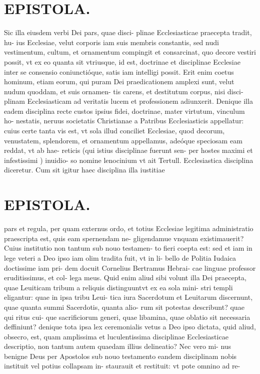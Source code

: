 \documentclass{article}
\begin{document}
\begin{pages}
\section*{EPISTOLA. }Sic illa eiusdem verbi Dei pars, quae disci- plinae Ecclesiasticae praecepta tradit, hu- ius Ecclesiae, velut corporis iam suis membris constantis, sed nudi vestimentum, cultum, et ornamentum compingit et consarcinat, quo decore vestiri possit, vt ex eo quanta sit vtriusque, id est, doctrinae et disciplinae Ecclesiae inter se consensio coniunctióque, satis iam intelligi possit. Erit enim coetus hominum, etiam eorum, qui puram Dei praedicationem amplexi sunt, velut nudum quoddam, et suis ornamen- tis carens, et destitutum corpus, nisi disci- plinam Ecclesiasticam ad veritatis lucem et professionem adiunxerit. Denique illa eadem disciplina recte custos ipsius fidei, doctrinae, mater virtutum, vinculum ho- nestatis, neruus societatis Christianae a Patribus Ecclesiasticis appellatur: cuius certe tanta vis est, vt sola illud conciliet Ecclesiae, quod decorum, venustatem, splendorem, et ornamentum appellamus, adeóque speciosam eam reddat, vt ab hae- reticis (qui istius disciplinae fuerunt sen- per hostes maximi et infestissimi ) inuidio- so nomine lenocinium vt ait Tertull. Ecclesiastica disciplina diceretur. Cum sit igitur haec disciplina illa iustitiae 
\section*{EPISTOLA. }pars et regula, per quam externus ordo, et totius Ecclesiae legitima administratio praescripta est, quis eam spernendam ne- gligendamue vnquam existimauerit? Cuius institutio non tantum sub nouo testamen- to fieri coepta est: sed et iam in lege veteri a Deo ipso iam olim tradita fuit, vt in li- bello de Politia Iudaica doctissime iam pri- dem docuit Cornelius Bertramus Hebrai- cae linguae professor eruditissimus, et col- lega meus. Quid enim aliud sibi volunt illa Dei praecepta, quae Leuiticam tribum a reliquis distinguuntvt ex ea sola mini- stri templi eligantur: quae in ipsa tribu Leui- tica iura Sacerdotum et Leuitarum discernunt, quae quanta summi Sacerdotis, quanta alio- rum sit potestas describunt? quae qui ritus cui- que sacrificiorum generi, quae libamina, quae oblatio sit necessaria deffiniunt? denique tota ipsa lex ceremonialis vetus a Deo ipso dictata, quid aliud, obsecro, est, quam amplissima et luculentissima disciplinae Ecclesiasticae descriptio, non tantum autem quaedam illius delineatio? Nec vero mi- nus benigne Deus per Apostolos sub nouo testamento eandem disciplinam nobis instituit vel potius collapsam in- staurauit et restituit: vt pote omnino ad re- 

\end{pages}
\end{document}
